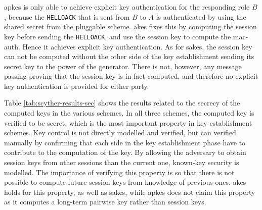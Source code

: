 \gls{apkes} is only able to achieve explicit key authentication for the responding role $B$, because the \texttt{HELLOACK} that is sent from $B$ to $A$ is authenticated by using the shared secret from the pluggable scheme. \gls{akes} fixes this by computing the session key before sending the \texttt{HELLOACK}, and use the session key to compute the \gls{mac-auth}. Hence it achieves explicit key authentication. As for \gls{sakes}, the session key can not be computed without the other side of the key establishment sending its secret key to the power of the generator. There is not, however, any message passing proving that the session key is in fact computed, and therefore no explicit key authentication is provided for either party.


Table \ref{tab:scyther-results-sec} shows the results related to the secrecy of the computed keys in the various schemes. In all three schemes, the computed key is verified to be secret, which is the most important property in key establishment schemes. Key control is not directly modelled and verified, but can verified manually by confirming that each side in the key establishment phase have to contribute to the computation of the key. By allowing the adversary to obtain session keys from other sessions than the current one, known-key security is modelled. The importance of verifying this property is so that there is not possible to compute future session keys from knowledge of previous ones. \gls{akes} holds for this property, as well as \gls{sakes}, while \gls{apkes} does not claim this property as it computes a long-term pairwise key rather than session keys.

\begin{table}[h]
\centering
{}
\caption{Table of the security properties for secrecy that are satisfied in the different protocols.}
\label{tab:scyther-results-sec}
\end{table}

